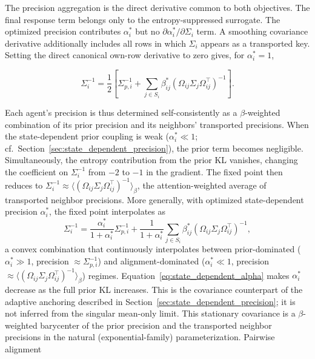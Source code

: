 \documentclass[twoside,11pt]{article}
\begin{document}
The precision aggregation is the direct derivative common to both objectives. The final response term belongs only to the entropy-suppressed surrogate. The optimized precision contributes $\alpha_i^*$ but no $\partial\alpha_i^*/\partial\Sigma_i$ term. A smoothing covariance derivative additionally includes all rows in which $\Sigma_i$ appears as a transported key. Setting the direct canonical own-row derivative to zero gives, for $\alpha_i^*=1$,

\begin{equation}
\Sigma_i^{-1}
=\frac{1}{2}
\left[
\Sigma_{p,i}^{-1}
+ \sum_{j\in S_i} \beta_{ij}^*
(\Omega_{ij}\Sigma_j\Omega_{ij}^\top)^{-1}
\right].
\label{eq:sigma_fixed_point_main}
\end{equation}

Each agent's precision is thus determined self-consistently as a
$\beta$-weighted combination of its prior precision and its neighbors'
transported precisions. When the state-dependent prior coupling is
weak ($\alpha_i^* \ll 1$; cf.\ Section~\ref{sec:state_dependent_precision}),
the prior term becomes negligible. Simultaneously, the entropy
contribution from the prior KL vanishes, changing the coefficient on
$\Sigma_i^{-1}$ from $-2$ to $-1$ in the gradient. The fixed point then
reduces to
$\Sigma_i^{-1} \approx
\langle(\Omega_{ij}\Sigma_j\Omega_{ij}^\top)^{-1}\rangle_\beta$,
the attention-weighted average of transported neighbor precisions.
More generally, with optimized state-dependent precision $\alpha_i^*$, the fixed point interpolates as
%
\begin{equation}
\Sigma_i^{-1}
= \frac{\alpha_i^*}{1+\alpha_i^*} \Sigma_{p,i}^{-1}
+ \frac{1}{1+\alpha_i^*}\sum_{j\in S_i} \beta_{ij}^*
(\Omega_{ij}\Sigma_j\Omega_{ij}^\top)^{-1},
\label{eq:sigma_fixed_point_alpha}
\end{equation}
%
a convex combination that continuously interpolates between
prior-dominated ($\alpha_i^* \gg 1$, precision $\approx \Sigma_{p,i}^{-1}$)
and alignment-dominated ($\alpha_i^* \ll 1$, precision
$\approx \langle(\Omega_{ij}\Sigma_j\Omega_{ij}^\top)^{-1}\rangle_\beta$)
regimes. Equation~\eqref{eq:state_dependent_alpha} makes $\alpha_i^*$ decrease as the full prior KL increases. This is the covariance counterpart of the adaptive anchoring described in Section~\ref{sec:state_dependent_precision}; it is not inferred from the singular mean-only limit.
This stationary covariance is a $\beta$-weighted barycenter of the
prior precision and the transported neighbor precisions in the natural
(exponential-family) parameterization. Pairwise alignment
\end{document}
